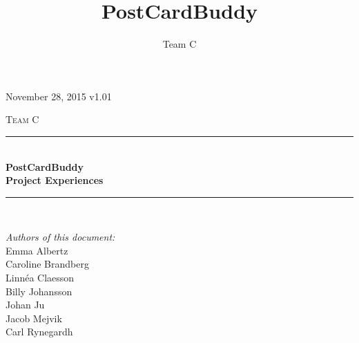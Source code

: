 \documentclass[10pt,a4paper]{article}
\title{PostCardBuddy}
\author{Team C}
\begin{document}
\begin{titlepage}
\newcommand{\HRule}{\rule{\linewidth}{0.5mm}}


\begin{flushright}
November 28, 2015 v1.01\\[3cm]
\end{flushright}


\centering
\textsc{\LARGE Team C}\\[0.5cm]

\HRule \\[0.4cm]
{ \huge \bfseries PostCardBuddy}\\[0.3cm]
{\Large \bfseries Project Experiences}\\[0.4cm] %
\HRule \\[1.5cm]

\vfill
\begin{flushleft}
\textit{Authors of this document:}\\
Emma Albertz\\
Caroline Brandberg\\
Linnéa Claesson\\
Billy Johansson\\
Johan Ju\\
Jacob Mejvik\\
Carl Rynegardh
\end{flushleft}

\end{titlepage}



%



\setcounter{tocdepth}{2}
\tableofcontents
\newpage
{}

\end{document}
